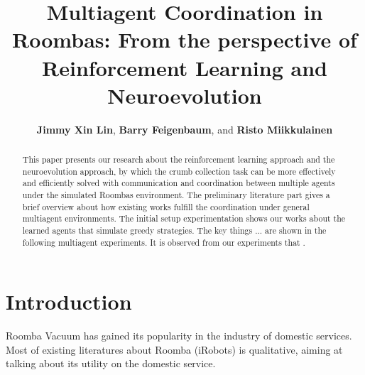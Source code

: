 \documentclass[conference]{IEEEtran}
\begin{document}
%
\title{Multiagent Coordination in Roombas: From the perspective of
    Reinforcement Learning and Neuroevolution}


\author{\textbf{Jimmy Xin Lin}, \textbf{Barry Feigenbaum}, and \textbf{Risto Miikkulainen}}


\maketitle

\begin{abstract}
    This paper presents our research about the reinforcement learning approach
    and the neuroevolution approach, by which the crumb collection task can be
    more effectively and efficiently solved with communication and
    coordination between multiple agents under the simulated Roombas
    environment.
    The preliminary literature part gives a brief overview about how existing
    works fulfill the coordination under general multiagent environments.
    The initial setup experimentation shows our works about the
    learned agents that simulate greedy strategies.
    The key things ... are shown in the following multiagent experiments.
    It is observed from our experiments that .
\end{abstract}

\IEEEpeerreviewmaketitle



\section{Introduction}
Roomba Vacuum has gained its popularity in the industry of domestic services. 
    Most of existing literatures about Roomba (iRobots) is qualitative, aiming
    at talking about its utility on the domestic service.
\end{document}
